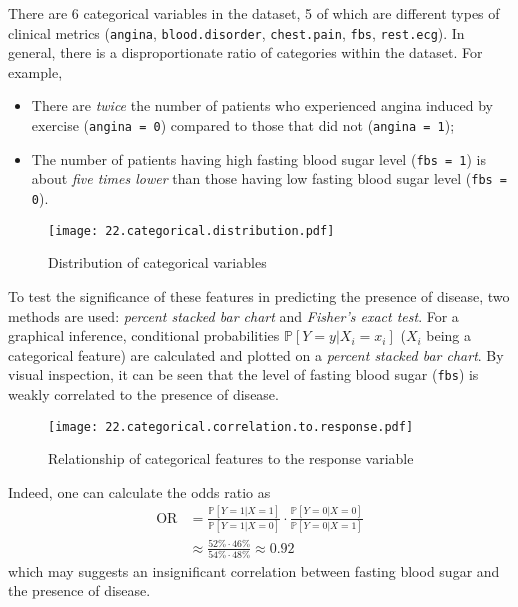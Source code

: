 There are 6 categorical variables in the dataset, 5 of which are different types of clinical metrics 
(\texttt{angina}, \texttt{blood.disorder}, \texttt{chest.pain}, \texttt{fbs}, \texttt{rest.ecg}). In general, there is a disproportionate ratio of categories within the dataset. For example,
\begin{itemize}
    \item There are \textit{twice} the number of patients who experienced angina induced by exercise (\texttt{angina = 0}) compared to those that did not (\texttt{angina = 1});
    \item The number of patients having high fasting blood sugar level (\texttt{fbs = 1}) is about \textit{five times lower} than those having low fasting blood sugar level (\texttt{fbs = 0}).
\end{itemize}

\begin{figure}[h]
    \centering
    \texttt{[image: 22.categorical.distribution.pdf]}
    \caption{\centering Distribution of categorical variables}
\end{figure}

To test the significance of these features in predicting the presence of disease, two methods are used: \textit{percent stacked bar chart} and \textit{Fisher's exact test}. For a graphical inference, conditional probabilities \( \mathbb P[Y = y | X_i = x_i] \) (\( X_i \) being a categorical feature) are calculated and plotted on a \textit{percent stacked bar chart}. By visual inspection, it can be seen that the level of fasting blood sugar (\texttt{fbs}) is weakly correlated to the presence of disease. 

\begin{figure}[h]
    \centering
    \texttt{[image: 22.categorical.correlation.to.response.pdf]}
    \caption{\centering Relationship of categorical features to the response variable}
\end{figure}

Indeed, one can calculate the odds ratio as
\begin{align*}
    \mathrm{OR} 
    &= 
    \frac{\mathbb P[Y = 1 | X = 1]}{\mathbb P[Y = 1 | X = 0]}\cdot
    \frac{\mathbb P[Y = 0 | X = 0]}{\mathbb P[Y = 0 | X = 1]}
    \\
    &\approx
    \frac{52\% \cdot 46\%}{54\% \cdot 48\%}
    \approx
    0.92
\end{align*}
which may suggests an insignificant correlation between fasting blood sugar and the presence of disease.

